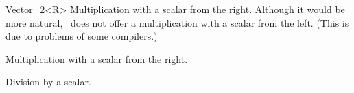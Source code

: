 \begin{ccRefClass} {Vector_2<R>}
       {Multiplication with a scalar from the right. Although it would
        be more natural, \cgal\ does not offer a multiplication with a 
        scalar from the left. (This is due to problems of some compilers.)}

       {Multiplication with a scalar from the right.}



       {Division by a scalar.}

\end{ccRefClass} 

